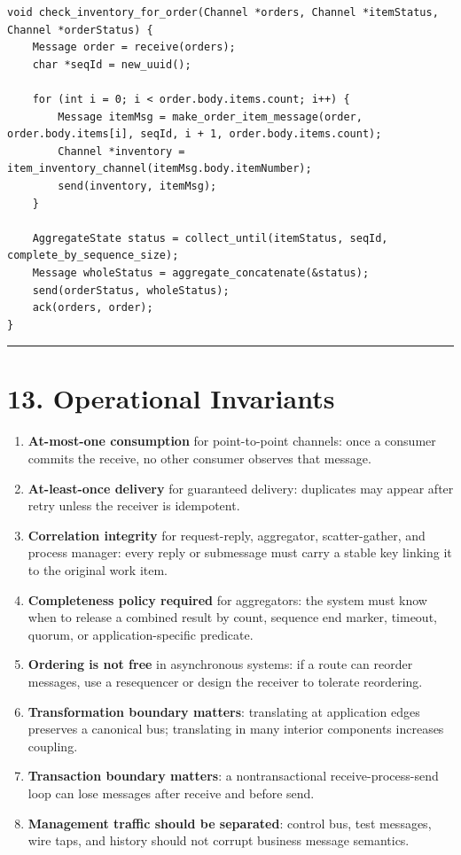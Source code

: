\documentclass[11pt]{article}
\providecommand{\tightlist}{\setlength{\itemsep}{0pt}\setlength{\parskip}{0pt}}
\begin{document}
\begin{verbatim}
void check_inventory_for_order(Channel *orders, Channel *itemStatus, Channel *orderStatus) {
    Message order = receive(orders);
    char *seqId = new_uuid();

    for (int i = 0; i < order.body.items.count; i++) {
        Message itemMsg = make_order_item_message(order, order.body.items[i], seqId, i + 1, order.body.items.count);
        Channel *inventory = item_inventory_channel(itemMsg.body.itemNumber);
        send(inventory, itemMsg);
    }

    AggregateState status = collect_until(itemStatus, seqId, complete_by_sequence_size);
    Message wholeStatus = aggregate_concatenate(&status);
    send(orderStatus, wholeStatus);
    ack(orders, order);
}
\end{verbatim}

\begin{center}\rule{0.5\linewidth}{0.5pt}\end{center}

\section{13. Operational Invariants}\label{operational-invariants}

\begin{enumerate}
\def\labelenumi{\arabic{enumi}.}
\tightlist
\item
  \textbf{At-most-one consumption} for point-to-point channels: once a
  consumer commits the receive, no other consumer observes that message.
\item
  \textbf{At-least-once delivery} for guaranteed delivery: duplicates
  may appear after retry unless the receiver is idempotent.
\item
  \textbf{Correlation integrity} for request-reply, aggregator,
  scatter-gather, and process manager: every reply or submessage must
  carry a stable key linking it to the original work item.
\item
  \textbf{Completeness policy required} for aggregators: the system must
  know when to release a combined result by count, sequence end marker,
  timeout, quorum, or application-specific predicate.
\item
  \textbf{Ordering is not free} in asynchronous systems: if a route can
  reorder messages, use a resequencer or design the receiver to tolerate
  reordering.
\item
  \textbf{Transformation boundary matters}: translating at application
  edges preserves a canonical bus; translating in many interior
  components increases coupling.
\item
  \textbf{Transaction boundary matters}: a nontransactional
  receive-process-send loop can lose messages after receive and before
  send.
\item
  \textbf{Management traffic should be separated}: control bus, test
  messages, wire taps, and history should not corrupt business message
  semantics.
\end{enumerate}
\end{document}
